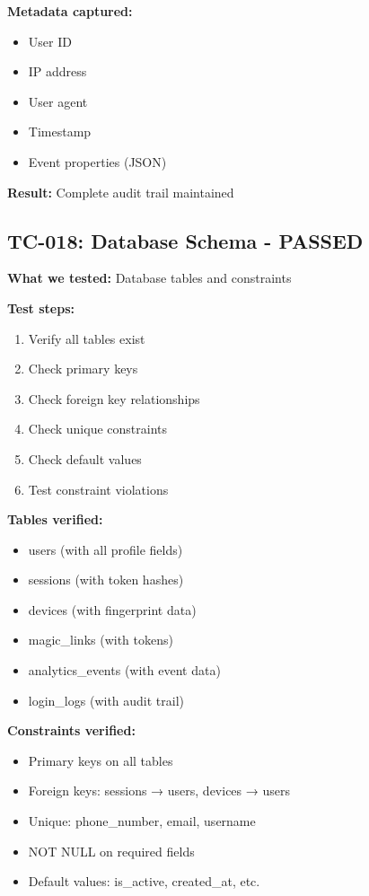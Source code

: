 \documentclass[11pt,a4paper]{article}
\begin{document}
\textbf{Metadata captured:}
\begin{itemize}
    \item User ID
    \item IP address
    \item User agent
    \item Timestamp
    \item Event properties (JSON)
\end{itemize}

\textbf{Result:} Complete audit trail maintained

\subsection{TC-018: Database Schema - PASSED}
\textbf{What we tested:} Database tables and constraints

\textbf{Test steps:}
\begin{enumerate}
    \item Verify all tables exist
    \item Check primary keys
    \item Check foreign key relationships
    \item Check unique constraints
    \item Check default values
    \item Test constraint violations
\end{enumerate}

\textbf{Tables verified:}
\begin{itemize}
    \item users (with all profile fields)
    \item sessions (with token hashes)
    \item devices (with fingerprint data)
    \item magic\_links (with tokens)
    \item analytics\_events (with event data)
    \item login\_logs (with audit trail)
\end{itemize}

\textbf{Constraints verified:}
\begin{itemize}
    \item Primary keys on all tables
    \item Foreign keys: sessions → users, devices → users
    \item Unique: phone\_number, email, username
    \item NOT NULL on required fields
    \item Default values: is\_active, created\_at, etc.
\end{itemize}
\end{document}
